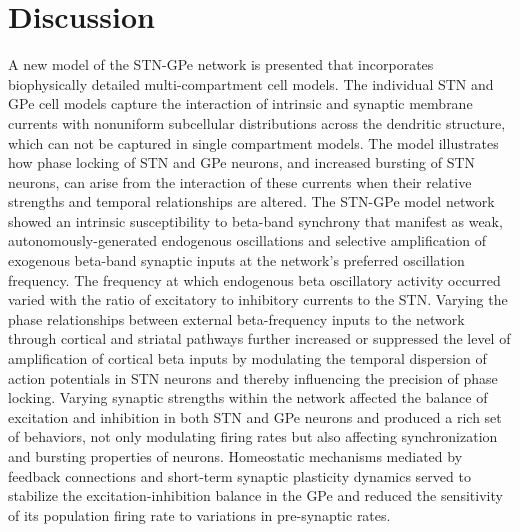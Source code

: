 %
%
%

%

%
%
%
%
%
%
%
%
%
%
%

%
%
%
\section{Discussion}
\label{sec:ch3-discussion}
%
%
%
%
%
%
%
%
%
%

%
%
A new model of the STN-GPe network is presented that incorporates biophysically detailed multi-compartment cell models. The individual STN and GPe cell models capture the interaction of intrinsic and synaptic membrane currents with nonuniform subcellular distributions across the dendritic structure, which can not be captured in single compartment models. The model illustrates how phase locking of STN and GPe neurons, and increased bursting of STN neurons, can arise from the interaction of these currents when their relative strengths and temporal relationships are altered. The STN-GPe model network showed an intrinsic susceptibility to beta-band synchrony that manifest as weak, autonomously-generated endogenous oscillations and selective amplification of exogenous beta-band synaptic inputs at the network's preferred oscillation frequency.  The frequency at which endogenous beta oscillatory activity occurred varied with the ratio of excitatory to inhibitory currents to the STN. Varying the phase relationships between external beta-frequency inputs to the network through cortical and striatal pathways further increased or suppressed the level of amplification of cortical beta inputs by modulating the temporal dispersion of action potentials in STN neurons and thereby influencing the precision of phase locking.
%
Varying synaptic strengths within the network affected the balance of excitation and inhibition in both STN and GPe neurons and produced a rich set of behaviors, not only modulating firing rates but also affecting synchronization and bursting properties of neurons. Homeostatic mechanisms mediated by feedback connections and short-term synaptic plasticity dynamics served to stabilize the excitation-inhibition balance in the GPe and reduced the sensitivity of its population firing rate to variations in pre-synaptic rates.

%
